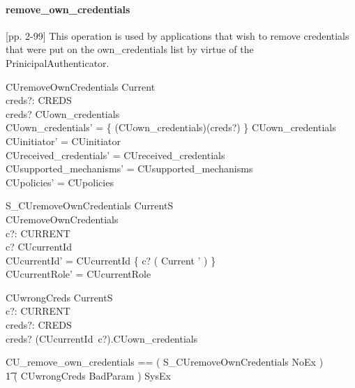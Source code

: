 \paragraph{remove\_own\_credentials}
[pp. 2-99] This operation is used by applications that wish to remove
credentials that were put on the own\_credentials list by virtue of the
PrinicipalAuthenticator. 


\begin{schema}{CUremoveOwnCredentials}
  \Delta Current \\
  creds?: CREDS \\
  \where
  creds? \in \ran CUown\_credentials \\

  CUown\_credentials' = \{ (CUown\_credentials\inv)(creds?) \} \extract
  CUown\_credentials \\
  CUinitiator' = CUinitiator \\
  CUreceived\_credentials' = CUreceived\_credentials \\
  CUsupported\_mechanisms' = CUsupported\_mechanisms \\
  CUpolicies' = CUpolicies\\ 
\end{schema}


\begin{schema}{S\_CUremoveOwnCredentials}
  \Delta CurrentS \\
  CUremoveOwnCredentials \\
  c?: CURRENT \\
  \where
  c? \in \dom CUcurrentId \\ 

  CUcurrentId' = CUcurrentId \oplus \{ c? \mapsto ( \theta Current ' ) \} \\ 
  CUcurrentRole' = CUcurrentRole \\
\end{schema}
\begin{schema}{CUwrongCreds}
  \Xi CurrentS \\
  c?: CURRENT \\
  creds?: CREDS \\
  \where
  creds? \notin \ran (CUcurrentId~c?).CUown\_credentials \\
\end{schema}
\begin{zed}
  CU\_remove\_own\_credentials == ( S\_CUremoveOwnCredentials \land NoEx ) \lor \\
  \t1 ( CUwrongCreds \land BadParam ) \lor SysEx
\end{zed}

